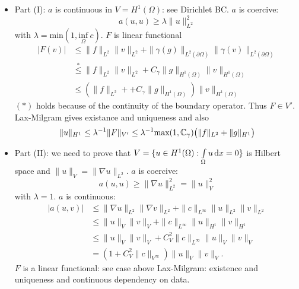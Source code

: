 \begin{enumerate}[=(\alph*)]
\begin{thrm}
	\end{thrm}
	\begin{proof_}\enter
		\begin{itemize}
			\item Part (I): \enter
				$a$ is continuous in $V = H^1(\Omega)$: see Dirichlet BC.\enter
				$a$ is coercive:
				\begin{equation*}
					a(u,u) \geq \lambda \|u\|^2_{L^2}
				\end{equation*}
				with $\lambda = \text{min}(1, \underset{\Omega}{\text{inf}}\ c )$.\enter
				$F$ is linear functional
				\begin{align*}
					|F(v)| & \leq \|f\|_{L^2} \|v\|_{L^2} + \|\gamma(g)\|_{L^2(\partial \Omega) } \|\gamma(v)\|_{L^2(\partial \Omega) }\\
					& \overset{*}{\leq} \|f\|_{L^2} \|v\|_{L^2} +C_\gamma \|g\|_{H^1(\Omega)}\|v\|_{H^1(\Omega)}\\
					& \leq \left( \|f\|_{L^2} + +C_\gamma \|g\|_{H^1(\Omega)} \right)\|v\|_{H^1(\Omega)}
				\end{align*}
				$(*)$ holds because of the continuity of the boundary operator. Thus $F \in V'$.\enter
				Lax-Milgram gives existance and uniqueness and also 
				\begin{equation*}
					 \|u\|_{H^1} \leq \lambda^{-1} \|F\|_{V'} \leq \lambda^{-1} \text{max}(1, \mathbb{C}_\gamma)\big (  \|f\|_{L^2} + \|g\|_{H^1} \big )
				\end{equation*}
			\item Part (II): \enter
				we need to prove that $ V = \{ u \in H^1(\Omega): \int \limits_\Omega u \mathop{}\!\mathrm{d} x =0 \}$ is Hilbert space and $\|u\|_V = \|\nabla u \|_{L^2}$.\enter
				$a$ is coercive:
				\begin{equation*}
					a(u,u) \geq \|\nabla u\|^2_{L^2} = \|u\|^2_V
				\end{equation*}
				with $\lambda = 1$.\enter
				$a$ is continuous:
				\begin{align*}
					|a(u,v)| &\leq \|\nabla u\|_{L^2}\|\nabla v\|_{L^2} + \|c\|_{L^\infty} \| u\|_{L^2} \|v\|_{L^2}\\
					& \leq \| u\|_{V}\| v\|_{V} + \|c\|_{L^\infty} \| u\|_{H^1} \|v\|_{H^1}\\
					& \leq \| u\|_{V}\| v\|_{V} + C^2_V\|c\|_{L^\infty} \| u\|_{V} \|v\|_{V}\\
					&= \left( 1 + C^2_V \|c\|_{V^\infty} \right) \|u\|_V \|v\|_V.
				\end{align*}
				$F$ is a linear functional: see case above\enter
				Lax-Milgram: existence and uniqueness and continuous dependency on data.

\end{itemize}
\end{proof_}
\end{enumerate}
